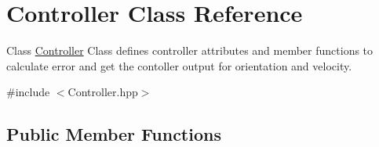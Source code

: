 \hypertarget{classController}{}\section{Controller Class Reference}
\label{classController}


Class \mbox{\hyperlink{classController}{Controller}} Class defines controller attributes and member functions to calculate error and get the contoller output for orientation and velocity.  




{\ttfamily \#include $<$Controller.\+hpp$>$}

\subsection*{Public Member Functions}
